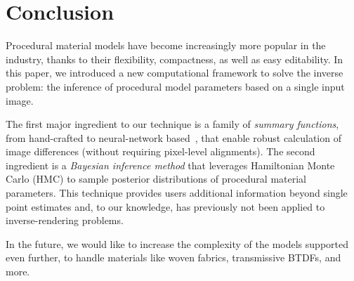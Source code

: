 \section{Conclusion}
\label{sec:conclusion}
%
%
Procedural material models have become increasingly more popular in the industry, thanks to their flexibility, compactness, as well as easy editability.
In this paper, we introduced a new computational framework to solve the inverse problem: the inference of procedural model parameters based on a single input image.

The first major ingredient to our technique is a family of \emph{summary functions}, from hand-crafted to neural-network based~\cite{Gatys2015,Aittala2016}, that enable robust calculation of image differences (without requiring pixel-level alignments). The second ingredient is a \emph{Bayesian inference method} that leverages Hamiltonian Monte Carlo (HMC) to sample posterior distributions of procedural material parameters.  This technique provides users additional information beyond single point estimates and, to our knowledge, has previously not been applied to inverse-rendering problems.

In the future, we would like to increase the complexity of the models supported even further, to handle materials like woven fabrics, transmissive BTDFs, and more.